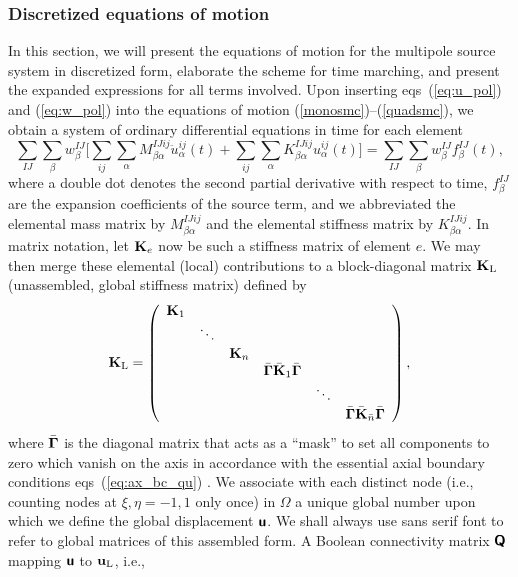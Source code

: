 \documentclass[11pt,letter,fleqn,english,notitlepage]{article}
\newcommand{\eq}{\begin{equation}} \newcommand{\en}{\end{equation}}
\newcommand{\eqa}{\begin{eqnarray}} \newcommand{\ena}{\end{eqnarray}}
\newcommand{\bu}{\mbox{${\bf u}$}} \newcommand{\bv}{\mbox{${\bf v}$}}
\newcommand{\bK}{\mbox{${\bf K}$}} \newcommand{\bS}{\mbox{${\bf S}$}}
\newcommand{\bsfu}{\mbox{\boldmath $\bf {\mathsf u}$}}
\newcommand{\bsfQ}{\mbox{\boldmath $\bf {\mathsf Q}$}}
\begin{document}
\subsubsection{Discretized equations of motion}\label{section:discr_eq_motion}
%
In this section, we will present the equations of motion for the 
multipole source system in discretized form, elaborate the scheme for 
time marching, and present the expanded expressions for all terms involved. 
Upon inserting eqs~(\ref{eq:u_pol}) and (\ref{eq:w_pol}) into the 
equations of motion (\ref{monosmc})--(\ref{quadsmc}), we obtain a system 
of ordinary differential equations in time for each element
\eq \label{eq:ode}
\sum_{IJ}\sum_{\beta}w_\beta^{IJ}\Big[\sum_{ij}\sum_{\alpha}
M^{IJij}_{\beta\alpha}\ddot{u}_\alpha^{ij}(t)+
\sum_{ij}\sum_{\alpha}K^{IJij}_{\beta\alpha}
u_\alpha^{ij}(t)\Big]=\sum_{IJ}\sum_{\beta}w_\beta^{IJ}f^{IJ}_\beta(t),
\en
where a double dot denotes the second partial derivative with respect to time, 
$f_\beta^{IJ}$ are the expansion coefficients of the source term, and 
we abbreviated the elemental mass matrix by $M^{IJij}_{\beta\alpha}$
and the elemental stiffness matrix by $K^{IJij}_{\beta\alpha}$.
In matrix notation, let $\bK_e$ now be such a stiffness matrix of element $e$.
We may then merge these elemental (local) contributions to a 
block-diagonal matrix $\bK_{\rm{L}}$ (unassembled, global stiffness matrix) 
defined by
%
\eqa
\bK_{\rm L}=\left(
\begin{array}{cccccc}
\bK_1 & & & & &   \\
& \ddots & & & &  \\
& & \bK_{n}  & &   & \\
& & & \bar{\bGamma}\bar{\bK}_1\bar{\bGamma}  & & \\
& & & & \ddots & \\
& & & & & \bar{\bGamma}\bar{\bK}_{\bar{n}}\bar{\bGamma}\\
\end{array}
\right),
\ena
%
where $\bar{\mbox{${\bf \Gamma}$}}$ is the diagonal matrix that acts as a ``mask'' to set 
all components to zero which vanish on the axis in accordance with the 
essential axial boundary conditions eqs~(\ref{eq:ax_bc_qu})
\citep{nissen+:07a,fournier04,bernardi}. We associate with each distinct node 
(i.e., counting nodes at $\xi,\eta=-1,1$ only once) in $\Omega$ a unique 
global number \citep{dfm} upon which we define the global displacement $\bsfu$.
We shall always use sans serif font to refer 
to global matrices of this assembled form. A Boolean connectivity 
matrix $\bsfQ$ mapping $\bsfu$ to $\bu_{\rm{L}}$, i.e., 
\end{document}
